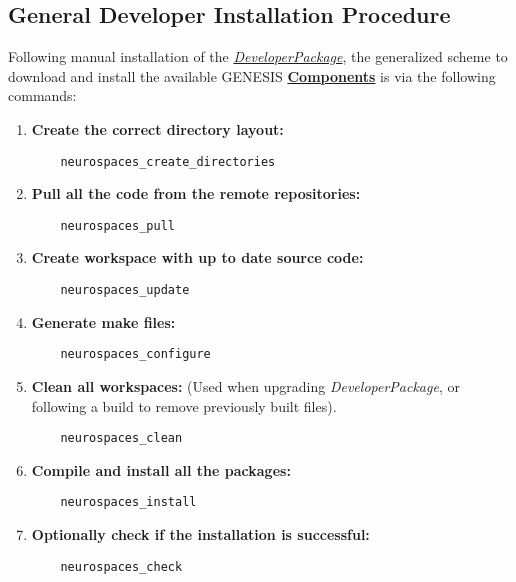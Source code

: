 \documentclass[12pt]{article}
\begin{document}
\subsection*{General Developer Installation Procedure}

Following manual installation of the \href{../developer-package/developer-package.tex}{\it DeveloperPackage}, the generalized scheme to download and install the available GENESIS \href{../reserved-words/reserved-words.tex}{\bf Components} is via the following commands:

\begin{enumerate}
\item {\bf Create the correct directory layout:}
\begin{verbatim}
	neurospaces_create_directories
\end{verbatim}
  
\item {\bf Pull all the code from the remote repositories:}
\begin{verbatim}
	neurospaces_pull
\end{verbatim}

\item {\bf Create workspace with up to date source code:}
\begin{verbatim}
	neurospaces_update
\end{verbatim}

\item {\bf Generate make files:}
\begin{verbatim}
	neurospaces_configure
\end{verbatim}

\item {\bf Clean all workspaces:} (Used when upgrading {\it DeveloperPackage}, or following a build to remove previously built files).
\begin{verbatim}
	neurospaces_clean
\end{verbatim}

\item {\bf Compile and install all the packages:}
\begin{verbatim}
	neurospaces_install
\end{verbatim}

\item {\bf Optionally check if the installation is successful:}
\begin{verbatim}
	neurospaces_check
\end{verbatim}

\end{enumerate}
\end{document}
